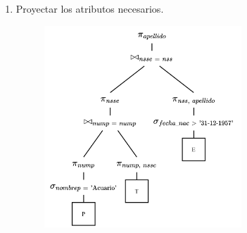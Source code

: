 \documentclass{templateNote}
\begin{document}
\begin{itemize}
\begin{enumerate}
        \newpage
        \item Proyectar los atributos necesarios.
        \begin{figure}[H]
            \centering
            \includegraphics[width=0.7\textwidth]{img/E5-Paso-6.png}
        \end{figure}
    \end{enumerate}
\end{itemize}
\end{document}
